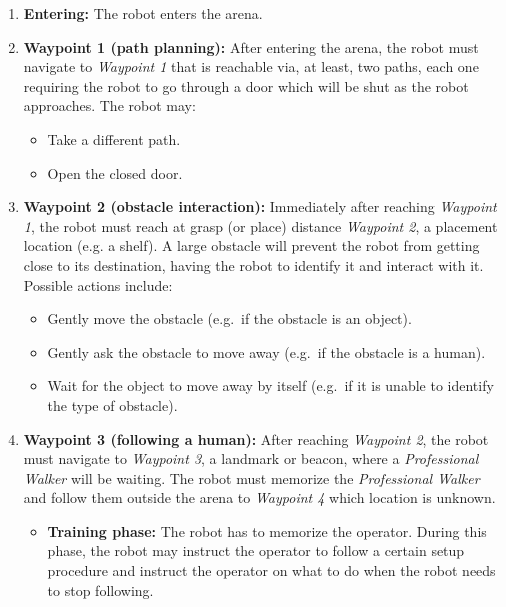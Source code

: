 \begin{enumerate}
	\item \textbf{Entering:} The robot enters the arena.

	\item \textbf{Waypoint 1 (path planning):} After entering the arena, the robot must navigate to \textit{Waypoint 1} that is reachable via, at least, two paths, each one requiring the robot to go through a door which will be shut as the robot approaches. The robot may:
	\begin{itemize}
		\item Take a different path.
		\item Open the closed door.
	\end{itemize}

	\item \textbf{Waypoint 2 (obstacle interaction):} Immediately after reaching \textit{Waypoint 1}, the robot must reach at grasp (or place) distance \textit{Waypoint 2}, a placement location (e.g. a shelf). A large obstacle will prevent the robot from getting close to its destination, having the robot to identify it and interact with it.
	Possible actions include:
	\begin{itemize}
		\item Gently move the obstacle (e.g.~if the obstacle is an object).
		\item Gently ask the obstacle to move away (e.g.~if the obstacle is a human).
		\item Wait for the object to move away by itself (e.g.~if it is unable to identify the type of obstacle).
	\end{itemize}

	\item \textbf{Waypoint 3 (following a human):} After reaching \textit{Waypoint 2}, the robot must navigate to \textit{Waypoint 3}, a landmark or beacon, where a \textit{Professional Walker} will be waiting. The robot must memorize the \textit{Professional Walker} and follow them outside the arena to \textit{Waypoint 4} which location is unknown.
	\begin{itemize}
		\item \textbf{Training phase:} The robot has to memorize the operator. During this phase, the robot may instruct the operator to follow a certain setup procedure and instruct the operator on what to do when the robot needs to stop following.
		

\end{itemize}
\end{enumerate}
